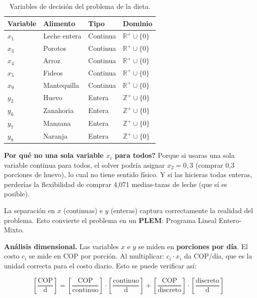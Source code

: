 \documentclass[12pt]{article}
\begin{document}
\begin{table}[h]
\centering
\begin{tabular}{llll}
\toprule
\textbf{Variable} & \textbf{Alimento} & \textbf{Tipo} & \textbf{Dominio} \\
\midrule
$x_1$ & Leche entera   & Continua & $\mathbb{R}^+ \cup \{0\}$ \\
$x_3$ & Porotos        & Continua & $\mathbb{R}^+ \cup \{0\}$ \\
$x_4$ & Arroz          & Continua & $\mathbb{R}^+ \cup \{0\}$ \\
$x_5$ & Fideos         & Continua & $\mathbb{R}^+ \cup \{0\}$ \\
$x_9$ & Mantequilla    & Continua & $\mathbb{R}^+ \cup \{0\}$ \\
\midrule
$y_2$ & Huevo          & Entera   & $\mathbb{Z}^+ \cup \{0\}$ \\
$y_6$ & Zanahoria      & Entera   & $\mathbb{Z}^+ \cup \{0\}$ \\
$y_7$ & Manzana        & Entera   & $\mathbb{Z}^+ \cup \{0\}$ \\
$y_8$ & Naranja        & Entera   & $\mathbb{Z}^+ \cup \{0\}$ \\
\bottomrule
\end{tabular}
\caption{Variables de decisi\'on del problema de la dieta.}
\end{table}

\begin{cajaroja}
\textbf{\textquestiondown Por qu\'e no una sola variable $x_i$ para todos?} Porque si usaras una sola variable continua para todos, el solver podr\'ia asignar $x_2 = 0{,}3$ (comprar 0,3 porciones de huevo), lo cual no tiene sentido f\'isico. Y si las hicieras todas enteras, perder\'ias la flexibilidad de comprar 4,071 medias-tazas de leche (que s\'i es posible).

La separaci\'on en $x$ (continuas) e $y$ (enteras) captura correctamente la realidad del problema. Esto convierte el problema en un \textbf{PLEM}: Programa Lineal Entero-Mixto.
\end{cajaroja}

\begin{cajanota}
\textbf{An\'alisis dimensional.} Las variables $x$ e $y$ se miden en \textbf{porciones por d\'ia}. El costo $c_i$ se mide en COP por porci\'on. Al multiplicar: $c_i \cdot x_i$ da COP/d\'ia, que es la unidad correcta para el costo diario. Esto se puede verificar as\'i:

\[
    \left[\frac{\text{COP}}{\text{d}}\right]
    = \left[\frac{\text{COP}}{\text{continuo}}\right] \cdot \left[\frac{\text{continuo}}{\text{d}}\right]
    + \left[\frac{\text{COP}}{\text{discreto}}\right] \cdot \left[\frac{\text{discreto}}{\text{d}}\right]
\]
\end{cajanota}
\end{document}
